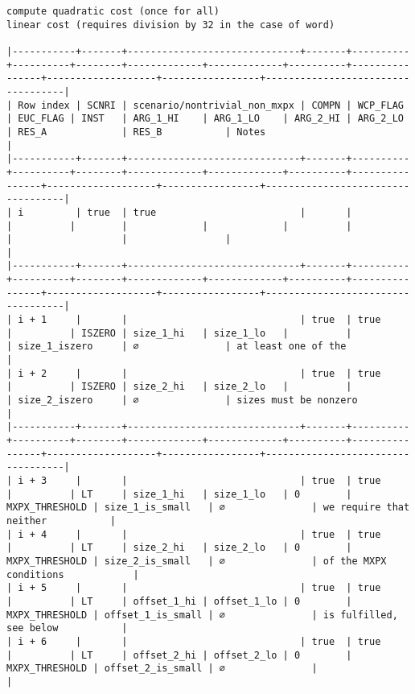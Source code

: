 \documentclass[varwidth=\maxdimen,margin=0.5cm,multi={verbatim}]{standalone}
\begin{document}
\begin{verbatim}
compute quadratic cost (once for all)
linear cost (requires division by 32 in the case of word)

|-----------+-------+------------------------------+-------+----------+----------+--------+-------------+-------------+----------+----------------+-------------------+-----------------+-----------------------------------|
| Row index | SCNRI | scenario/nontrivial_non_mxpx | COMPN | WCP_FLAG | EUC_FLAG | INST   | ARG_1_HI    | ARG_1_LO    | ARG_2_HI | ARG_2_LO       | RES_A             | RES_B           | Notes                             |
|-----------+-------+------------------------------+-------+----------+----------+--------+-------------+-------------+----------+----------------+-------------------+-----------------+-----------------------------------|
| i         | true  | true                         |       |          |          |        |             |             |          |                |                   |                 |                                   |
|-----------+-------+------------------------------+-------+----------+----------+--------+-------------+-------------+----------+----------------+-------------------+-----------------+-----------------------------------|
| i + 1     |       |                              | true  | true     |          | ISZERO | size_1_hi   | size_1_lo   |          |                | size_1_iszero     | ∅               | at least one of the               |
| i + 2     |       |                              | true  | true     |          | ISZERO | size_2_hi   | size_2_lo   |          |                | size_2_iszero     | ∅               | sizes must be nonzero             |
|-----------+-------+------------------------------+-------+----------+----------+--------+-------------+-------------+----------+----------------+-------------------+-----------------+-----------------------------------|
| i + 3     |       |                              | true  | true     |          | LT     | size_1_hi   | size_1_lo   | 0        | MXPX_THRESHOLD | size_1_is_small   | ∅               | we require that neither           |
| i + 4     |       |                              | true  | true     |          | LT     | size_2_hi   | size_2_lo   | 0        | MXPX_THRESHOLD | size_2_is_small   | ∅               | of the MXPX conditions            |
| i + 5     |       |                              | true  | true     |          | LT     | offset_1_hi | offset_1_lo | 0        | MXPX_THRESHOLD | offset_1_is_small | ∅               | is fulfilled, see below           |
| i + 6     |       |                              | true  | true     |          | LT     | offset_2_hi | offset_2_lo | 0        | MXPX_THRESHOLD | offset_2_is_small | ∅               |                                   |

\end{verbatim}
\end{document}
